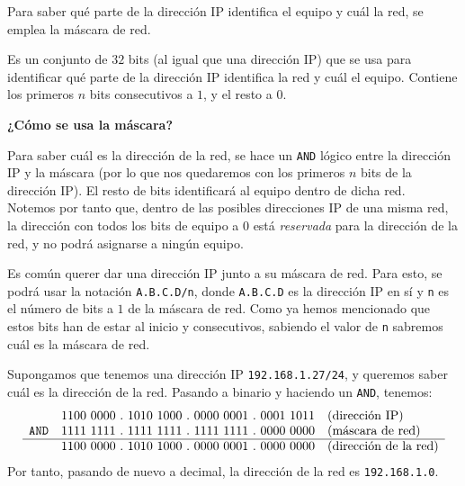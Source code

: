 Para saber qué parte de la dirección IP identifica el equipo y cuál la red, se emplea la máscara de red.
\begin{definicion}
    Es un conjunto de $32$ bits (al igual que una dirección IP) que se usa para identificar qué parte de la dirección IP identifica la red y cuál el equipo. Contiene los primeros $n$ bits consecutivos a $1$, y el resto a $0$.
\end{definicion}
\textbf{¿Cómo se usa la máscara?}\

Para saber cuál es la dirección de la red, se hace un \verb|AND| lógico entre la dirección IP y la máscara (por lo que nos quedaremos con los primeros $n$ bits de la dirección IP\@). El resto de bits identificará al equipo dentro de dicha red.\\

Notemos por tanto que, dentro de las posibles direcciones IP de una misma red, la dirección con todos los bits de equipo a 0 está \emph{reservada} para la dirección de la red, y no podrá asignarse a ningún equipo.
\begin{notacion}
    Es común querer dar una dirección IP junto a su máscara de red. Para esto, se podrá usar la notación \verb|A.B.C.D/n|, donde \verb|A.B.C.D| es la dirección IP en sí y \verb|n| es el número de bits a $1$ de la máscara de red. Como ya hemos mencionado que estos bits han de estar al inicio y consecutivos, sabiendo el valor de \verb|n| sabremos cuál es la máscara de red.
\end{notacion}

\begin{ejemplo}
    Supongamos que tenemos una dirección IP \verb|192.168.1.27/24|, y queremos saber cuál es la dirección de la red. Pasando a binario y haciendo un \verb|AND|, tenemos:
    \begin{equation*}
        \begin{array}{rcl}
            & 1100~0000~.~1010~1000~.~0000~0001~.~0001~1011 & \text{(dirección IP)}\\
            \texttt{AND} & 1111~1111~.~1111~1111~.~1111~1111~.~0000~0000 & \text{(máscara de red)}\\ \hline
            & 1100~0000~.~1010~1000~.~0000~0001~.~0000~0000 & \text{(dirección de la red)}
        \end{array}
    \end{equation*}
    Por tanto, pasando de nuevo a decimal, la dirección de la red es \verb|192.168.1.0|.
\end{ejemplo}

